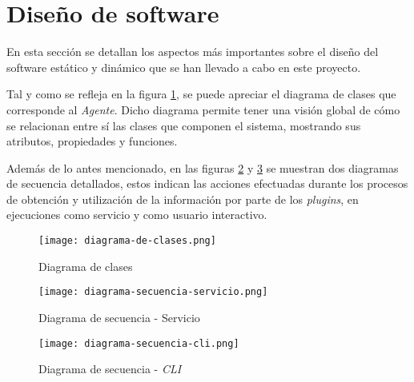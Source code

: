 \section{Diseño de software} \label{sec:dis}

    En esta sección se detallan los aspectos más importantes sobre el diseño del software estático y dinámico que se han llevado a cabo en este proyecto.
    
    Tal y como se refleja en la figura \ref{fig:class-diagram}, se puede apreciar el diagrama de clases que corresponde al \textit{Agente}. Dicho diagrama permite tener una visión global de cómo se relacionan entre sí las clases que componen el sistema, mostrando sus atributos, propiedades y funciones.
    
    Además de lo antes mencionado, en las figuras \ref{fig:sequence-diagram-service} y \ref{fig:sequence-diagram-cli} se muestran dos diagramas de secuencia detallados, estos indican las acciones efectuadas durante los procesos de obtención y utilización de la información por parte de los \textit{plugins}, en ejecuciones como servicio y como usuario interactivo.

    \begin{figure}[H]
    \centering
        \texttt{[image: diagrama-de-clases.png]}
        \caption{Diagrama de clases}
        \label{fig:class-diagram}
    \end{figure}

    \begin{figure}[H]
    \centering
        \texttt{[image: diagrama-secuencia-servicio.png]}
        \caption{Diagrama de secuencia - Servicio}
        \label{fig:sequence-diagram-service}
    \end{figure}
    
    \begin{figure}[H]
    \centering
        \texttt{[image: diagrama-secuencia-cli.png]}
        \caption{Diagrama de secuencia - \textit{CLI}}
        \label{fig:sequence-diagram-cli}
    \end{figure}
    